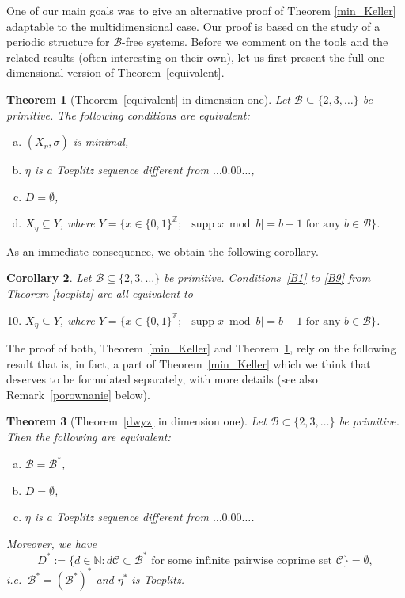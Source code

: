 \documentclass[leqno,a4paper,12pt]{article}
\newtheorem{Th}{Theorem}[section]
\newtheorem{Cor}[Th]{Corollary}
\theoremstyle{definition}
\newcommand{\Z}{{\mathbb{Z}}}
\newcommand{\N}{{\mathbb{N}}}
\newcommand{\cC}{\mathcal{C}}
\newcommand{\sB}{\mathscr{B}}
\begin{document}
One of our main goals was to give an alternative proof of Theorem \ref{min_Keller} adaptable to the multidimensional case. Our proof is based on the study of a periodic structure for $\sB$-free systems. Before we comment on the tools and the related results (often interesting on their own), let us first present the full one-dimensional version of Theorem~\ref{equivalent}.
\begin{Th}[Theorem~\ref{equivalent} in dimension one]\label{onedim}
Let $\mathscr{B}\subseteq\{2,3,\ldots\}$ be primitive. The following conditions are equivalent:
\begin{enumerate}[(a)]
\item $(X_\eta,\sigma)$ is minimal,\label{min_one}
\item $\eta$ is a Toeplitz sequence different from $\ldots0.00\ldots$,\label{top_one}
\item $D=\emptyset$,
\item $X_\eta\subseteq Y$, where $Y=\{x\in\{0,1\}^\Z;\ |\operatorname{supp }x \bmod b|=b-1\text{ for any }b\in\sB\}$.\label{Y_one}
\end{enumerate}
\end{Th}
As an immediate consequence, we obtain the following corollary.
\begin{Cor}\label{toeplitzall}
Let $\mathscr{B}\subseteq\{2,3,\ldots\}$ be primitive. Conditions~\eqref{B1} to \eqref{B9} from Theorem \ref{toeplitz} are all equivalent to
\begin{enumerate}[(1)]
\setcounter{enumi}{9}
\item $X_\eta\subseteq Y$, where $Y=\{x\in\{0,1\}^\Z;\ |\operatorname{supp }x \bmod b|=b-1\text{ for any }b\in\sB\}$.
\end{enumerate}
\end{Cor}


The proof of both, Theorem~\ref{min_Keller} and Theorem~\ref{onedim}, rely on the following result that is, in fact, a part of Theorem~\ref{min_Keller} which we think that deserves to be formulated separately, with more details (see also Remark~\ref{porownanie} below).
\begin{Th}[Theorem~\ref{dwyz} in dimension one]\label{d}
Let $\mathscr{B}\subset \{2,3,\dots\}$ be primitive. Then the following are equivalent:
\begin{enumerate}[(a)]
\item $\sB=\sB^*$,
\item $D=\emptyset$,
\item $\eta$ is a Toeplitz sequence different from $\ldots0.00\ldots$.
\end{enumerate}
Moreover, we have
\[
D^*:=\{d\in\N :  d\cC\subset\sB^* \text{ for some infinite pairwise coprime set }\cC\}=\emptyset,
\]
i.e.\ $\sB^*=(\sB^*)^*$ and $\eta^*$ is Toeplitz.
\end{Th}
\end{document}

